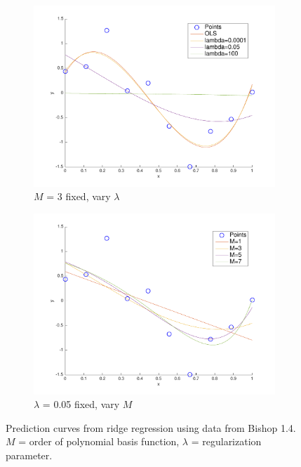 \begin{figure}[h!]
\centering
    \begin{subfigure}[b]{0.4\textwidth}
	\includegraphics[scale=0.5]{hw1_3_1a.pdf}
	\caption{$M$ = 3 fixed, vary $\lambda$}
    \end{subfigure}
    \quad\quad\quad\quad\quad
    \begin{subfigure}[b]{0.4\textwidth}
	\includegraphics[scale=0.5]{hw1_3_1b.pdf}
	\caption{$\lambda$ = 0.05 fixed, vary $M$}
    \end{subfigure}
    \hfill
\caption{Prediction curves from ridge regression using data from Bishop 1.4.  $M$ = order of polynomial basis function, $\lambda$ = regularization parameter.} \label{fig:ridge_plots}
\end{figure}

